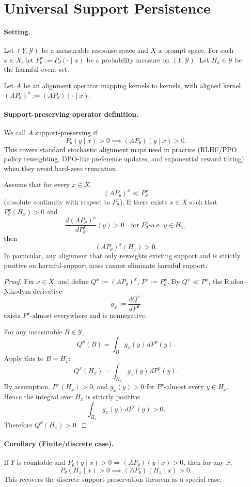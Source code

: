\section{Universal Support Persistence}

\paragraph{Setting.}
Let \((Y,\mathcal{Y})\) be a measurable response space and \(X\) a prompt space.
For each \(x\in X\), let \(P_\theta^x := P_\theta(\cdot\mid x)\) be a probability measure on \((Y,\mathcal{Y})\).
Let \(H_x\in\mathcal{Y}\) be the harmful event set.

Let \(A\) be an alignment operator mapping kernels to kernels, with aligned kernel
\((AP_\theta)^x := (AP_\theta)(\cdot\mid x)\).

\paragraph{Support-preserving operator definition.}
We call \(A\) support-preserving if
\[
P_\theta(y\mid x)>0 \implies (AP_\theta)(y\mid x)>0.
\]
This covers standard stochastic alignment maps used in practice (RLHF/PPO policy reweighting, DPO-like preference updates, and exponential reward tilting) when they avoid hard-zero truncation.

\begin{theorem}
Assume that for every \(x\in X\),
\[
(AP_\theta)^x \ll P_\theta^x
\]
(absolute continuity with respect to \(P_\theta^x\)).
If there exists \(x\in X\) such that \(P_\theta^x(H_x)>0\) and
\[
\frac{d(AP_\theta)^x}{dP_\theta^x}(y) > 0
\quad\text{for }P_\theta^x\text{-a.e. } y\in H_x,
\]
then
\[
(AP_\theta)^x(H_x) > 0.
\]
In particular, any alignment that only reweights existing support and is strictly positive on harmful-support mass cannot eliminate harmful support.
\end{theorem}

\begin{proof}
Fix \(x\in X\), and define \(Q^x:=(AP_\theta)^x\), \(P^x:=P_\theta^x\).
By \(Q^x\ll P^x\), the Radon--Nikodym derivative
\[
g_x := \frac{dQ^x}{dP^x}
\]
exists \(P^x\)-almost everywhere and is nonnegative.

For any measurable \(B\in\mathcal{Y}\),
\[
Q^x(B)=\int_B g_x(y)\,dP^x(y).
\]
Apply this to \(B=H_x\):
\[
Q^x(H_x)=\int_{H_x} g_x(y)\,dP^x(y).
\]
By assumption, \(P^x(H_x)>0\), and \(g_x(y)>0\) for \(P^x\)-almost every \(y\in H_x\).
Hence the integral over \(H_x\) is strictly positive:
\[
\int_{H_x} g_x(y)\,dP^x(y) > 0.
\]
Therefore \(Q^x(H_x)>0\).
\end{proof}

\paragraph{Corollary (Finite/discrete case).}
If \(Y\) is countable and \(P_\theta(y\mid x)>0\Rightarrow (AP_\theta)(y\mid x)>0\), then for any \(x\),
\[
P_\theta(H_x\mid x)>0 \implies (AP_\theta)(H_x\mid x)>0.
\]
This recovers the discrete support-preservation theorem as a special case.
